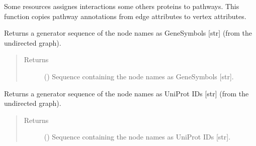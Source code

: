 \documentclass[letterpaper,10pt,english]{sphinxmanual}
\begin{document}
\begin{fulllineitems}
\begin{fulllineitems}
\begin{description}
\end{description}

\end{fulllineitems}


\begin{fulllineitems}
\label{\detokenize{main:pypath.main.PyPath.vertex_pathways}}
Some resources assignes interactions some others proteins to
pathways. This function copies pathway annotations from edge
attributes to vertex attributes.

\end{fulllineitems}


\begin{fulllineitems}
\label{\detokenize{main:pypath.main.PyPath.vs}}
\end{fulllineitems}


\begin{fulllineitems}
\label{\detokenize{main:pypath.main.PyPath.vsgs}}
Returns a generator sequence of the node names as GeneSymbols
{[}str{]} (from the undirected graph).
\begin{quote}\begin{description}
\item[{Returns}] \leavevmode
() \textendash{} Sequence containing the node names as
GeneSymbols {[}str{]}.

\end{description}\end{quote}

\end{fulllineitems}


\begin{fulllineitems}
\label{\detokenize{main:pypath.main.PyPath.vsup}}
Returns a generator sequence of the node names as UniProt IDs
{[}str{]} (from the undirected graph).
\begin{quote}\begin{description}
\item[{Returns}] \leavevmode
() \textendash{} Sequence containing the node names as
UniProt IDs {[}str{]}.


\end{description}
\end{quote}
\end{fulllineitems}
\end{fulllineitems}
\end{document}
